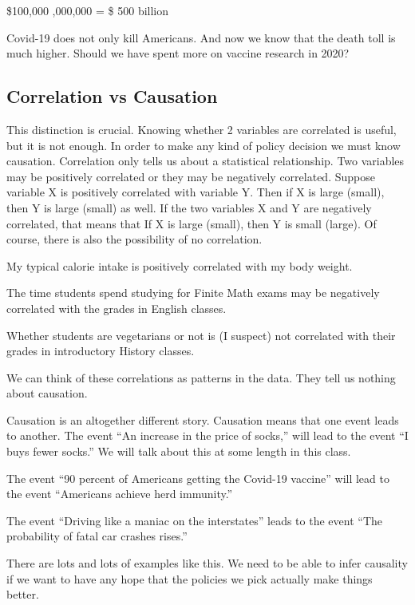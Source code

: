 \documentclass[
]{book}
\begin{document}
\$100,000  ,000,000 = \$ 500 billion

Covid-19 does not only kill Americans. And now we know that the death toll is much higher. Should we have spent more on vaccine research in 2020?

\hypertarget{correlation-vs-causation}{%
\subsection{Correlation vs Causation}\label{correlation-vs-causation}}

This distinction is crucial. Knowing whether 2 variables are correlated is useful, but it is not enough. In order to make any kind of policy decision we must know causation. Correlation only tells us about a statistical relationship. Two variables may be positively correlated or they may be negatively correlated. Suppose variable X is positively correlated with variable Y. Then if X is large (small), then Y is large (small) as well. If the two variables X and Y are negatively correlated, that means that If X is large (small), then Y is small (large). Of course, there is also the possibility of no correlation.

My typical calorie intake is positively correlated with my body weight.

The time students spend studying for Finite Math exams may be negatively correlated with the grades in English classes.

Whether students are vegetarians or not is (I suspect) not correlated with their grades in introductory History classes.

We can think of these correlations as patterns in the data. They tell us nothing about causation.

Causation is an altogether different story. Causation means that one event leads to another. The event ``An increase in the price of socks,'' will lead to the event ``I buys fewer socks.'' We will talk about this at some length in this class.

The event ``90 percent of Americans getting the Covid-19 vaccine'' will lead to the event ``Americans achieve herd immunity.''

The event ``Driving like a maniac on the interstates'' leads to the event ``The probability of fatal car crashes rises.''

There are lots and lots of examples like this. We need to be able to infer causality if we want to have any hope that the policies we pick actually make things better.
\end{document}
